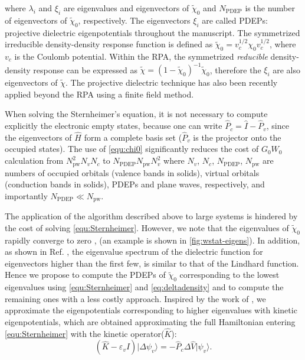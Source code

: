 \documentclass[aip,preprint]{revtex4-1}
\begin{document}
where $\lambda_i$ and $\xi_i$ are eigenvalues and eigenvectors of $\tilde{\chi}_0$ and $N_\mathrm{PDEP}$ is the number of eigenvectors of $\tilde{\chi}_0$, respectively. The eigenvectors $\xi_i$ are called PDEPs: projective dielectric eigenpotentials throughout the manuscript. The symmetrized irreducible density-density response function is defined as $\tilde{\chi}_0 = v_c^{1/2}\chi_0v_c^{1/2}$, where $v_c$ is the Coulomb potential.\cite{Marco2015} Within the RPA, the symmetrized \textit{reducible} density-density response can be expressed as  $\tilde{\chi}=\left(1-\tilde{\chi}_0\right)^{-1}\tilde{\chi}_0$, therefore the $\xi_i$ are also eigenvectors of $\tilde{\chi}$. The projective dielectric technique has also been recently applied beyond the RPA using a finite field method.\cite{HeMa2018JCTC}

When solving the Sternheimer's equation, it is not necessary to compute explicitly the electronic empty states, because one can write $\hat{P}_c = \hat{I}-\hat{P}_v$, since the eigenvectors of $\hat{H}$ form a complete basis set ($\hat{P}_v$ is the projector onto the occupied states). The use of \autoref{equ:chi0} significantly reduces the cost of $G_0W_0$ calculation from $N_\mathrm{pw}^2N_vN_c$ to $N_\mathrm{PDEP} N_\mathrm{pw}N_v^2$ where $N_v$, $N_c$, $N_\mathrm{PDEP}$, $N_\mathrm{pw}$ are numbers of occupied orbitals (valence bands in solids), virtual orbitals (conduction bands in solids), PDEPs and plane waves, respectively, and importantly $N_\mathrm{PDEP}\ll N_\mathrm{pw}$.

The application of the algorithm described above   to large systems is hindered by the cost of  solving \autoref{equ:Sternheimer}. However, we note that the eigenvalues of $\tilde{\chi}_0$ rapidly converge to zero ,\cite{Deyu2008PRL,wilson2008,wilson2009,Marco2018} (an example is shown in \autoref{fig:wstat-eigens}). In addition, as shown in Ref. , the eigenvalue spectrum of the dielectric function for eigenvectors higher than the first few, is similar to that of the Lindhard function.\cite{LindhardFunction1954} Hence we propose to compute the PDEPs of $\tilde{\chi}_0$ corresponding to the lowest eigenvalues using \autoref{equ:Sternheimer} and \ref{eq:deltadensity} and to compute the remaining ones with a less costly approach. Inspired by the work of \citet{Rocca2014}, we  approximate the eigenpotentials corresponding to higher eigenvalues with kinetic eigenpotentials, which are obtained approximating the full Hamiltonian entering \autoref{equ:Sternheimer} with the kinetic operator($\hat{K}$):\cite{RPA_total_energy-PRL2009,Rocca2014}
\begin{equation}
    (\hat{K}-\varepsilon_v\hat{I})\lvert\Delta\psi_v\rangle = -\hat{P}_c\Delta \hat{V}\lvert\psi_v\rangle\label{equ:KineticSternheimer}.
\end{equation}
\end{document}
